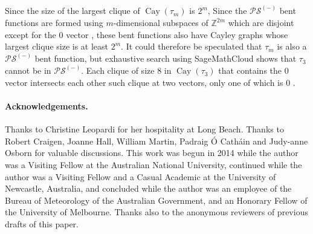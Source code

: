 \documentclass[12pt,a4paper]{article}
\newcommand{\mb}[1]{\mathbb{#1}}
\newcommand{\Cay}{\operatorname{Cay}}
\newcommand{\Z}{\mb{Z}}
\begin{document}
Since the size of the largest clique of $\Cay(\tau_m)$ is $2^m$,
Since the $\mathcal{PS}^{(-)}$ bent functions are formed using $m$-dimensional subspaces of
$\Z^{2m}$ which are disjoint except for the $0$ vector \cite[p. 95]{Dil74},
these bent functions also have Cayley graphs whose largest clique size is at least $2^m$.
It could therefore be speculated that $\tau_m$ is also a $\mathcal{PS}^{(-)}$ bent function,
but exhaustive search using SageMathCloud \cite{SageMathCloud} shows that $\tau_3$ cannot be in
$\mathcal{PS}^{(-)}$.
Each clique of size 8 in $\Cay(\tau_3)$ that contains the 0 vector intersects each other such
clique at two vectors, only one of which is 0 \cite{Leo16SMC}.

\paragraph*{Acknowledgements.}

Thanks to Christine Leopardi for her hospitality at Long Beach.
Thanks to Robert Craigen, Joanne Hall, William Martin,
Padraig {\'O} Cath{\'a}in and Judy-anne Osborn for valuable discussions.
This work was begun in 2014 while the author was a Visiting Fellow at the Australian National University,
continued while the author was a Visiting Fellow and a Casual Academic at the University of Newcastle, Australia,
and concluded while the author was an employee of the Bureau of Meteorology of the Australian
Government, and an Honorary Fellow of the University of Melbourne.
Thanks also to the anonymous reviewers of previous drafts of this paper.








%
\end{document}
